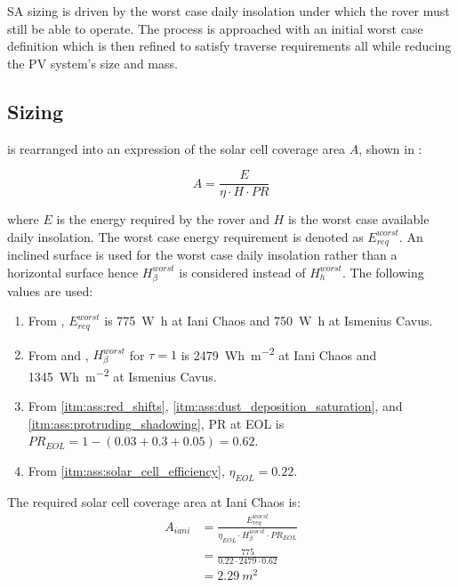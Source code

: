 \ac{SA} sizing is driven by the worst case daily insolation under which the rover must still be able to operate. The process is approached with an initial worst case definition which is then refined to satisfy traverse requirements all while reducing the \ac{PV} system's size and mass.

\subsection{Sizing}
 is rearranged into an expression of the solar cell coverage area $A$, shown in :

\begin{equation}
  \label{eq:solar_cell_coverage_area}
  A = \frac{E}{\eta \cdot H \cdot PR}
\end{equation}

where $E$ is the energy required by the rover and $H$ is the worst case available daily insolation. The worst case energy requirement is denoted as $E_{req}^{worst}$. An inclined surface is used for the worst case daily insolation rather than a horizontal surface hence $H_{\beta}^{worst}$ is considered instead of $H_{h}^{worst}$. The following values are used:

\begin{enumerate}[label=\textcolor{BulletBlue}{(\alph*)}]
    \item From , $E_{req}^{worst}$ is \SI{775}{\watt\hour} at Iani Chaos and \SI{750}{\watt\hour} at Ismenius Cavus.
    \item From  and , $H_{\beta}^{worst}$ for $\tau=1$ is \SI{2479}{Wh.m^{-2}} at Iani Chaos and \SI{1345}{Wh.m^{-2}} at Ismenius Cavus.
    \item From \ref{itm:ass:red_shifts}, \ref{itm:ass:dust_deposition_saturation}, and \ref{itm:ass:protruding_shadowing}, \ac{PR} at \ac{EOL} is $PR_{EOL} = 1 - (0.03 + 0.3 + 0.05) = 0.62$.
    \item From \ref{itm:ass:solar_cell_efficiency}, $\eta_{EOL} = 0.22$.
\end{enumerate}


The required solar cell coverage area at Iani Chaos is:
\begin{align}
  \label{calc:solar_cell_area_iani_chaos_traverse}
  A_{iani} &= \frac{E_{req}^{worst}}{\eta_{EOL} \cdot H_{\beta}^{worst} \cdot PR_{EOL}}\\
           &= \frac{775}{0.22 \cdot 2479 \cdot 0.62}\\
           &= \SI{2.29}{m^{2}}
\end{align}

